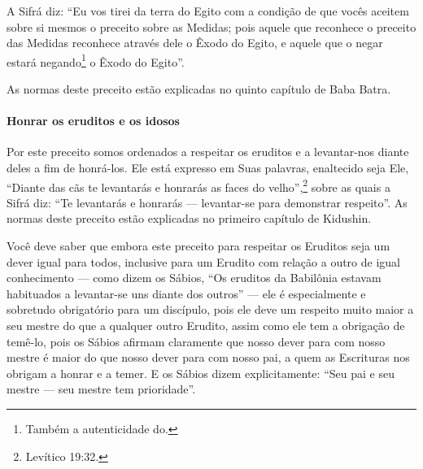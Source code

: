 A Sifrá diz: ``Eu vos tirei da terra do Egito com a condição de que
vocês aceitem sobre si mesmos o preceito sobre as Medidas; pois aquele
que reconhece o preceito das Medidas reconhece através dele o Êxodo do
Egito, e aquele que o negar estará negando\footnote{Também a autenticidade do.} o
Êxodo do Egito''.

As normas deste preceito estão explicadas no quinto capítulo de Baba Batra.

\paragraph{Honrar os eruditos e os idosos}

Por este preceito somos ordenados a respeitar os eruditos e a
levantar-nos diante deles a fim de honrá-los. Ele está expresso em Suas
palavras, enaltecido seja Ele, ``Diante das cãs te levantarás e
honrarás as faces do velho'',\footnote{Levítico 19:32.} sobre as quais a Sifrá diz: ``Te levantarás e honrarás ---
levantar-se para demonstrar respeito''. As normas deste preceito estão
explicadas no primeiro capítulo de Kidushin.

Você deve saber que embora este preceito para respeitar os Eruditos
seja um dever igual para todos, inclusive para um Erudito com relação a
outro de igual conhecimento --- como dizem os Sábios, ``Os eruditos da
Babilônia estavam habituados a levantar-se uns diante dos outros'' ---
ele é especialmente e sobretudo obrigatório para um discípulo, pois ele
deve um respeito muito maior a seu mestre do que a qualquer outro
Erudito, assim como ele tem a obrigação de temê-lo, pois os Sábios
afirmam claramente que nosso dever para com nosso mestre é maior do que
nosso dever para com nosso pai, a quem as Escrituras nos obrigam a
honrar e a temer. E os Sábios dizem explicitamente: ``Seu pai e seu
mestre --- seu mestre tem prioridade''.

